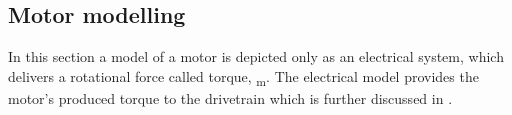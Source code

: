 \subsection{Motor modelling}\label{motormodelling}
In this section a model of a motor is depicted only as an electrical system, which delivers a rotational force called torque, \si{\tau_m}. The electrical model provides the motor's produced torque to the drivetrain which is further discussed in .

%
%
%
%
%
%
%
%
%
%

